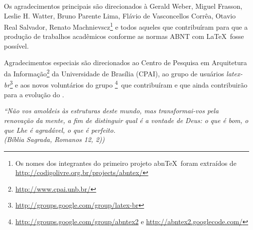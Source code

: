 \documentclass[
	12pt,				%
	openright,			%
	oneside,			%
	a4paper,			%
	tccpreliminar,			%
	]{ABNT-DC-UEL}
\begin{document}
\begin{agradecimentos}
Os agradecimentos principais são direcionados à Gerald Weber, Miguel Frasson,
Leslie H. Watter, Bruno Parente Lima, Flávio de Vasconcellos Corrêa, Otavio Real
Salvador, Renato Machnievscz\footnote{Os nomes dos integrantes do primeiro
projeto abn\TeX\ foram extraídos de
\url{http://codigolivre.org.br/projects/abntex/}} e todos aqueles que
contribuíram para que a produção de trabalhos acadêmicos conforme
as normas ABNT com \LaTeX\ fosse possível.

Agradecimentos especiais são direcionados ao Centro de Pesquisa em Arquitetura
da Informação\footnote{\url{http://www.cpai.unb.br/}} da Universidade de
Brasília (CPAI), ao grupo de usuários
\emph{latex-br}\footnote{\url{http://groups.google.com/group/latex-br}} e aos
novos voluntários do grupo
\emph{\abnTeX}\footnote{\url{http://groups.google.com/group/abntex2} e
\url{http://abntex2.googlecode.com/}}~que contribuíram e que ainda
contribuirão para a evolução do \abnTeX.

\end{agradecimentos}

\begin{epigrafe}
  \vspace*{\fill}
  \hspace{.4\textwidth}
  \begin{minipage}{.5\textwidth}   
    \begin{flushright}
	\textit{
    ``Não vos amoldeis às estruturas deste mundo,
      mas transformai-vos pela renovação da mente,
      a fim de distinguir qual é a vontade de Deus:
      o que é bom, o que Lhe é agradável, o que é perfeito.\\
      (Bíblia Sagrada, Romanos 12, 2))}
    \end{flushright}
  \end{minipage}
\end{epigrafe}

\end{document}
